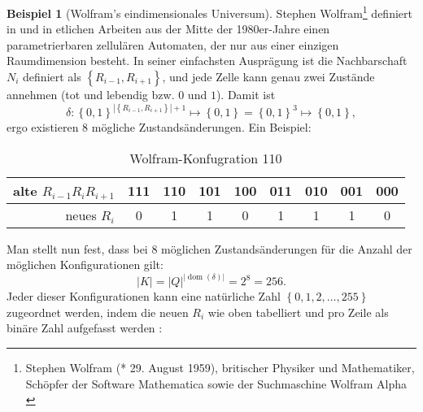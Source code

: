 \documentclass[11pt]{article} %
\theoremstyle{definition}
\newtheorem*{beisp}{Beispiel}
\begin{document}
\begin{beisp}[Wolfram's eindimensionales Universum] Stephen Wolfram\footnote{Stephen Wolfram (* 29. August 1959), britischer Physiker und Mathematiker, Schöpfer der Software Mathematica sowie der Suchmaschine Wolfram Alpha \cite{wiki:wolfram}} definiert in \cite{wolfram2002} und in etlichen Arbeiten aus der Mitte der 1980er-Jahre einen parametrierbaren zellulären Automaten, der nur aus einer einzigen Raumdimension besteht\cite{wiki:wolfram}. In seiner einfachsten Ausprägung ist die Nachbarschaft $N_i$ definiert als $\left\{ R_{i-1}, R_{i+1} \right\}$, und jede Zelle kann genau zwei Zustände annehmen (tot und lebendig bzw. $0$ und $1$). Damit ist
\begin{equation*}
\delta : \left\{0,1\right\}^{|\left\{ R_{i-1}, R_{i+1}\right\}|+ 1} \mapsto \left\{0,1\right\} = \left\{0,1\right\}^3 \mapsto \left\{0,1\right\},
\end{equation*}
ergo existieren 8 mögliche Zustandsänderungen. Ein Beispiel:

\begin{table}[here]
\begin{center}
\begin{tabular}{|r||c|c|c|c|c|c|c|c|}
\hline
alte $R_{i-1}R_iR_{i+1}$ &111& 110 & 101 &100 &011 &010 &001 &000  \\\hline
neues $R_i$ & 0 & 1 & 1 & 0& 1 & 1 & 1 & 0 \\\hline
\end{tabular}
\end{center}
\caption{Wolfram-Konfugration 110}
\label{wolfram110}
\end{table}

Man stellt nun fest, dass bei 8 möglichen Zustandsänderungen für die Anzahl der möglichen Konfigurationen gilt:
\begin{equation*}
|K| = |Q|^{|\operatorname{dom}(\delta)|} = 2^8 = 256.
\end{equation*}
Jeder dieser Konfigurationen kann eine natürliche Zahl $\left\{0, 1, 2, \dots, 255\right\}$ zugeordnet werden, indem die neuen $R_i$ wie oben tabelliert und pro Zeile als binäre Zahl aufgefasst werden \cite{betz2003}:


\end{beisp}
\end{document}
